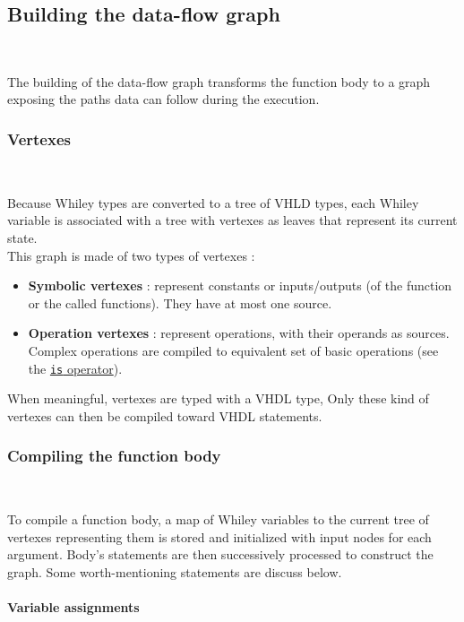 \documentclass[10pt,a4paper]{article}
\newcommand{\code}{\texttt}
\renewcommand{\indent}{~\\\vspace{-.8cm}}
\newcommand{\pindent}{~\\\indent}
\begin{document}
\subsection{Building the data-flow graph}
\indent

The building of the data-flow graph transforms the function body to a graph exposing the paths data can follow during the execution. 


\subsubsection{Vertexes}
\indent

Because Whiley types are converted to a tree of VHLD types, each Whiley variable is associated with a tree with vertexes as leaves that represent its current state. \\

This graph is made of two types of vertexes : 
\begin{itemize}
	\item \textbf{Symbolic vertexes} : represent constants or inputs/outputs (of the function or the called functions). They have at most one source.
	\item \textbf{Operation vertexes} : represent operations, with their operands as sources. Complex operations are compiled to equivalent set of basic operations (see the \hyperref[FlowT]{\code {is} operator}).
\end{itemize}



When meaningful, vertexes are typed with a VHDL type, Only these kind of vertexes can then be compiled toward VHDL statements.



\subsubsection{Compiling the function body} \indent

To compile a function body, a map of Whiley variables to the current tree of vertexes representing them is stored and initialized with input nodes for each argument. Body's statements are then successively processed to construct the graph. Some worth-mentioning statements are discuss below.

\paragraph{Variable assignments}\pindent
\end{document}
